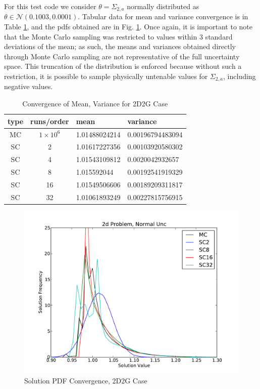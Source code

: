 For this test code we consider $\theta=\Sigma_{2,a}$ normally distributed as $\theta\in\mathcal{N}(0.1003,0.0001)$. Tabular data for mean and variance convergence is in Table \ref{tab:2dcrit}, and the pdfs obtained are in Fig. \ref{fig:2dcrit}.  Once again, it is important to note that the Monte Carlo sampling was restricted to values within 3 standard deviations of the mean; as such, the means and variances obtained directly through Monte Carlo sampling are not representative of the full uncertainty space.  This truncation of the distribution is enforced because without such a restriction, it is possible to sample physically untenable values for $\Sigma_{2,a}$, including negative values.

\begin{table}
\begin{center}
\begin{tabular}{c c|l l}
type & runs/order & mean & variance \\ \hline
MC & $1\times10^6$ & 1.01488024214 & 0.00196794483094 \\
SC & 2 & 1.01617227356 & 0.00103920580302 \\
SC & 4 & 1.01543109812 & 0.0020042932657 \\
SC & 8 & 1.015592044 & 0.00192541919329 \\
SC & 16 & 1.01549506606 & 0.00189209311817 \\
SC & 32 & 1.01061893249 & 0.00227815756915
\end{tabular}
\end{center}
\caption{Convergence of Mean, Variance for 2D2G Case}
\label{tab:2dcrit}
\end{table}

\begin{figure}[h!]
\centering
   \includegraphics[width=\textwidth]{../graphics/2d_normal_pdfs}
   \caption{Solution PDF Convergence, 2D2G Case}
   \label{fig:2dcrit}
\end{figure}



